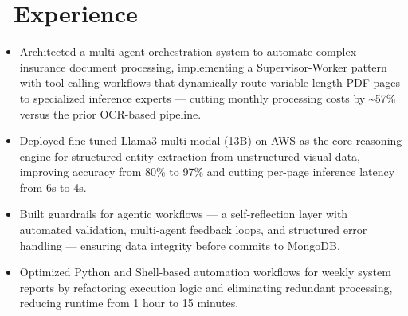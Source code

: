 \documentclass[10pt]{resume}
\begin{document}
\vspace{-1em}
\section{\color{red} \faUsers\ Experience %
}

\vspace{-0.6em}
\begin{itemize}
\item Architected a multi-agent orchestration system to automate complex insurance document processing, implementing a Supervisor-Worker pattern with tool-calling workflows that dynamically route variable-length PDF pages to specialized inference experts --- cutting monthly processing costs by \textasciitilde57\% versus the prior OCR-based pipeline.
\item Deployed fine-tuned Llama3 multi-modal (13B) on AWS as the core reasoning engine for structured entity extraction from unstructured visual data, improving accuracy from 80\% to 97\% and cutting per-page inference latency from 6s to 4s.
\item Built guardrails for agentic workflows — a self-reflection layer with automated validation, multi-agent feedback loops, and structured error handling — ensuring data integrity before commits to MongoDB. %
\item Optimized Python and Shell-based automation workflows for weekly system reports by refactoring execution logic and eliminating redundant processing, reducing runtime from 1 hour to 15 minutes.
\end{itemize}
\end{document}
